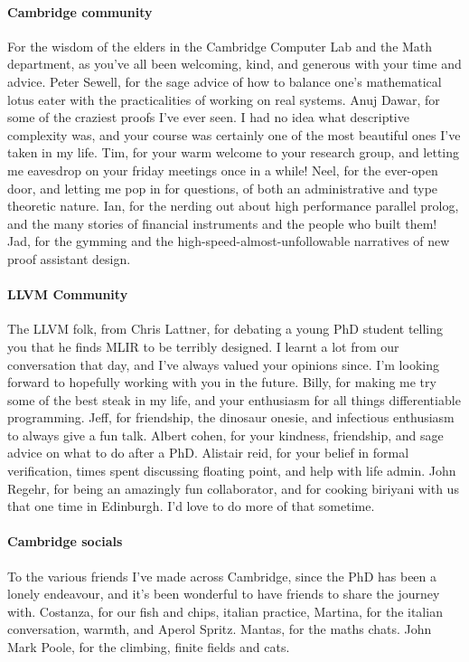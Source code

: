 \paragraph{Cambridge community}
For the wisdom of the elders in the Cambridge Computer Lab and the Math department,
as you've all been welcoming, kind, and generous with your time and advice.
Peter Sewell, for the sage advice of how to balance one's mathematical lotus eater with the practicalities of working on real systems.
Anuj Dawar, for some of the craziest proofs I've ever seen. I had no idea what descriptive complexity was,
and your course was certainly one of the most beautiful ones I've taken in my life.
Tim, for your warm welcome to your research group, and letting me eavesdrop on your friday meetings once in a while!
Neel, for the ever-open door, and letting me pop in for questions, of both an administrative and type theoretic nature.
Ian, for the nerding out about high performance parallel prolog, and the many stories of financial instruments and the people who built them!
Jad, for the gymming and the high-speed-almost-unfollowable narratives of new proof assistant design.

\paragraph{LLVM Community}
The LLVM folk, from Chris Lattner, for debating a young PhD student telling you that he finds MLIR to be terribly designed.
I learnt a lot from our conversation that day, and I've always valued your opinions since.
I'm looking forward to hopefully working with you in the future.
Billy, for making me try some of the best steak in my life, and your enthusiasm for all things differentiable programming.
Jeff, for friendship, the dinosaur onesie, and infectious enthusiasm to always give a fun talk.
Albert cohen, for your kindness, friendship, and sage advice on what to do after a PhD.
Alistair reid, for your belief in formal verification, times spent discussing floating point, and help with life admin.
John Regehr, for being an amazingly fun collaborator, and for cooking biriyani with us that one time in Edinburgh.
I'd love to do more of that sometime.

\paragraph{Cambridge socials}
To the various friends I've made across Cambridge,
since the PhD has been a lonely endeavour, and it's been wonderful to have friends to share the journey with.
Costanza, for our fish and chips, italian practice, 
Martina, for the italian conversation, warmth, and Aperol Spritz.
Mantas, for the maths chats.
John Mark Poole, for the climbing, finite fields and cats.

